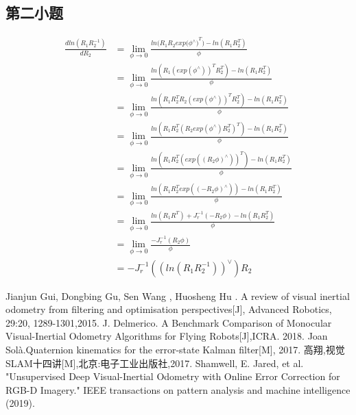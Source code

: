 \documentclass[UTF8]{ctexart}
\begin{document}
\subsection{第二小题}
\begin{equation}
\begin{aligned}
\frac{dln({R_1}{R^{-1}_2})}{dR_2}
&=\lim_{\phi \to 0}\frac{{ln({R_1{{R_2exp({\phi^\wedge)}^T}})}-{ln({R_1R^T_2})}}}{\phi}\\
&=\lim_{\phi \to 0}\frac{ln(R_1(exp(\phi^\wedge))^TR^T_2)-{ln({R_1R^T_2})}}{\phi}\\
&=\lim_{\phi \to 0}\frac{{ln(R_1R^T_2R_2(exp(\phi^\wedge))^TR^T_2)}-{ln({R_1R^T_2})}}{\phi}\\
&=\lim_{\phi \to 0}\frac{ln(R_1R^T_2(R_2exp(\phi^\wedge)R^T_2)^T)-ln({R_1R^T_2})}{\phi}\\
&=\lim_{\phi \to 0}\frac{ln(R_1R^T_2(exp((R_2\phi)^\wedge))^T)-ln(R_1R^T_2)}{\phi}\\
&=\lim_{\phi \to 0}\frac{ln(R_1R^T_2exp((-R_2\phi)^\wedge))-ln(R_1R^T_2)}{\phi}\\
&=\lim_{\phi \to 0}\frac{ln(R_1R^T)+J^{-1}_r(-R_2\phi)-ln(R_1R^T_2)}{\phi}\\
&=\lim_{\phi \to 0}\frac{-J^{-1}_r(R_2\phi)}{\phi}\\
&=-J^{-1}_r((ln(R_1R^{-1}_2))^\vee)R_2
\end{aligned}
\end{equation}

\newpage
\begin{thebibliography}{1}
  Jianjun Gui, Dongbing Gu, Sen Wang , Huosheng Hu . A review of
visual inertial odometry from filtering and optimisation perspectives[J], Advanced Robotics, 29:20,
1289-1301,2015.
 J. Delmerico. A Benchmark Comparison of Monocular Visual-Inertial Odometry Algorithms for Flying Robots[J],ICRA. 2018.
 Joan Solà.Quaternion kinematics for the error-state Kalman filter[M], 2017.
 高翔,视觉SLAM十四讲[M],北京:电子工业出版社,2017.
Shamwell, E. Jared, et al. "Unsupervised Deep Visual-Inertial Odometry with Online 
Error Correction for RGB-D Imagery." IEEE transactions on pattern analysis and machine intelligence (2019).
\end{thebibliography}
\end{document}
